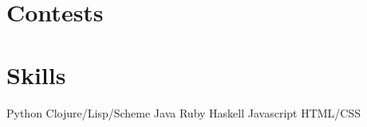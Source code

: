 \documentclass[letterpaper]{deedy-resume} %
\begin{document}
\begin{minipage}[t]{0.33\textwidth}
\sectionspace


\section{Contests} 





\section{Skills}

Python \textbullet{} Clojure/Lisp/Scheme \textbullet{} Java \textbullet{} Ruby 
\textbullet{} Haskell \textbullet{} Javascript \textbullet{} HTML/CSS


\sectionspace %


\end{minipage} %
\end{document}
